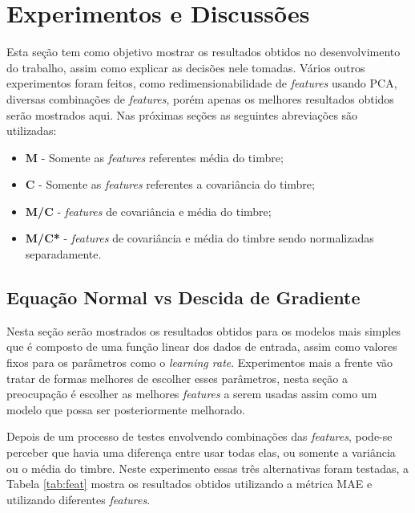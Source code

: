 \documentclass[conference]{IEEEtran}
\begin{document}


\section{Experimentos e Discussões} \label{sec:exp}

Esta seção tem como objetivo mostrar os resultados obtidos no desenvolvimento do trabalho, assim como explicar as decisões nele tomadas. Vários outros experimentos foram feitos, como redimensionabilidade de \emph{features} usando PCA, diversas combinações de \emph{features}, porém apenas os melhores resultados obtidos serão mostrados aqui. Nas próximas seções as seguintes abreviações são utilizadas:

\begin{itemize}
	\item \textbf{M} - Somente as \emph{features} referentes média do timbre;
	\item \textbf{C} - Somente as \emph{features} referentes a covariância do timbre;
	\item \textbf{M/C} - \emph{features} de covariância e média do timbre;
	\item \textbf{M/C*} - \emph{features} de covariância e média do timbre sendo normalizadas separadamente.
\end{itemize}

\subsection{Equação Normal vs Descida de Gradiente}

Nesta seção serão mostrados os resultados obtidos para os modelos mais simples que é composto de uma função linear dos dados de entrada, assim como valores fixos para os parâmetros como o \emph{learning rate}. Experimentos mais a frente vão tratar de formas melhores de escolher esses parâmetros, nesta seção a preocupação é escolher as melhores \emph{features} a serem usadas assim como um modelo que possa ser posteriormente melhorado.

Depois de um processo de testes envolvendo combinações das \emph{features}, pode-se perceber que havia uma diferença entre usar todas elas, ou somente a variância ou o média do timbre. Neste experimento essas três alternativas foram testadas, a Tabela \ref{tab:feat} mostra os resultados obtidos utilizando a métrica MAE e utilizando diferentes \emph{features}.
\end{document}
